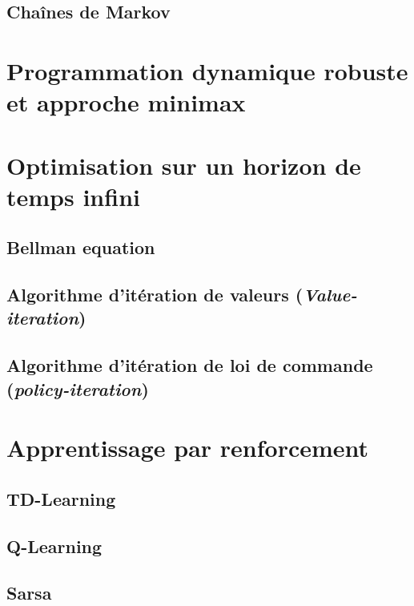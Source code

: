 \subsection{Chaînes de Markov}



\section{Programmation dynamique robuste et approche minimax}




\section{Optimisation sur un horizon de temps infini}

\subsection{Bellman equation}


\subsection{Algorithme d'itération de valeurs (\textit{Value-iteration})}

\subsection{Algorithme d'itération de loi de commande (\textit{policy-iteration})}


\section{Apprentissage par renforcement}


\subsection{TD-Learning}

\subsection{Q-Learning}

\subsection{Sarsa}


